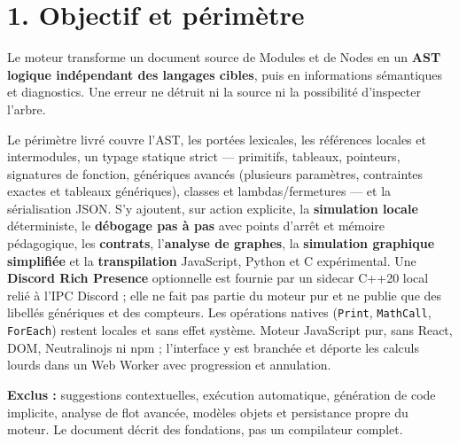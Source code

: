 \documentclass[11pt,a4paper]{article}
\newcommand{\code}[1]{\texttt{#1}}
\newcommand{\chaptertitle}[2]{\noindent{\small\sffamily SAPPHIRE 3 --- FONDATIONS LOGIQUES\hfill #1/4}\par\vspace{4mm}{\LARGE\sffamily\bfseries #2}\par\vspace{3mm}}
\begin{document}
\chaptertitle{1}{Objectif et modèle conceptuel}

\section*{1. Objectif et périmètre}
Le moteur transforme un document source de Modules et de Nodes en un
\textbf{AST logique indépendant des langages cibles}, puis en informations
sémantiques et diagnostics. Une erreur ne détruit ni la source ni la
possibilité d'inspecter l'arbre.

Le périmètre livré couvre l'AST, les portées lexicales, les références locales
et intermodules, un typage statique strict — primitifs, tableaux, pointeurs,
signatures de fonction, génériques avancés (plusieurs paramètres, contraintes
exactes et tableaux génériques), classes et lambdas/fermetures — et la sérialisation JSON.
S'y ajoutent, sur action explicite, la \textbf{simulation locale} déterministe,
le \textbf{débogage pas à pas} avec points d'arrêt et mémoire pédagogique, les
\textbf{contrats}, l'\textbf{analyse de graphes}, la \textbf{simulation
graphique simplifiée} et la \textbf{transpilation} JavaScript, Python et C expérimental. Une
\textbf{Discord Rich Presence} optionnelle est fournie par un sidecar C++20 local
relié à l'IPC Discord ; elle ne fait pas partie du moteur pur et ne publie que
des libellés génériques et des compteurs. Les
opérations natives (\code{Print}, \code{MathCall}, \code{ForEach}) restent
locales et sans effet système. Moteur JavaScript pur, sans React, DOM,
Neutralinojs ni npm ; l'interface y est branchée et déporte les calculs lourds
dans un Web Worker avec progression et annulation.

\textbf{Exclus :} suggestions contextuelles, exécution automatique, génération
de code implicite, analyse de flot avancée, modèles objets et persistance
propre du moteur. Le document décrit des fondations, pas un compilateur complet.
\end{document}
